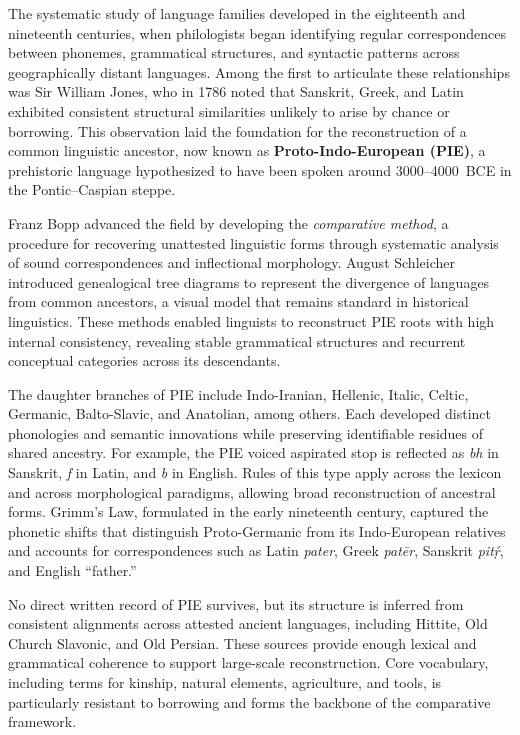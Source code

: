 \begin{historical}
The systematic study of language families developed in the eighteenth and nineteenth centuries, when philologists began identifying regular correspondences between phonemes, grammatical structures, and syntactic patterns across geographically distant languages. Among the first to articulate these relationships was Sir William Jones, who in 1786 noted that Sanskrit, Greek, and Latin exhibited consistent structural similarities unlikely to arise by chance or borrowing. This observation laid the foundation for the reconstruction of a common linguistic ancestor, now known as \textbf{Proto-Indo-European (PIE)}, a prehistoric language hypothesized to have been spoken around 3000–4000~BCE in the Pontic–Caspian steppe.

Franz Bopp advanced the field by developing the \textit{comparative method}, a procedure for recovering unattested linguistic forms through systematic analysis of sound correspondences and inflectional morphology. August Schleicher introduced genealogical tree diagrams to represent the divergence of languages from common ancestors, a visual model that remains standard in historical linguistics. These methods enabled linguists to reconstruct PIE roots with high internal consistency, revealing stable grammatical structures and recurrent conceptual categories across its descendants.

The daughter branches of PIE include Indo-Iranian, Hellenic, Italic, Celtic, Germanic, Balto-Slavic, and Anatolian, among others. Each developed distinct phonologies and semantic innovations while preserving identifiable residues of shared ancestry. For example, the PIE voiced aspirated stop  is reflected as \emph{bh} in Sanskrit, \emph{f} in Latin, and \emph{b} in English. Rules of this type apply across the lexicon and across morphological paradigms, allowing broad reconstruction of ancestral forms. Grimm’s Law, formulated in the early nineteenth century, captured the phonetic shifts that distinguish Proto-Germanic from its Indo-European relatives and accounts for correspondences such as Latin \emph{pater}, Greek \emph{patēr}, Sanskrit \emph{pitṛ́}, and English “father.”

No direct written record of PIE survives, but its structure is inferred from consistent alignments across attested ancient languages, including Hittite, Old Church Slavonic, and Old Persian. These sources provide enough lexical and grammatical coherence to support large-scale reconstruction. Core vocabulary, including terms for kinship, natural elements, agriculture, and tools, is particularly resistant to borrowing and forms the backbone of the comparative framework.


\end{historical}
